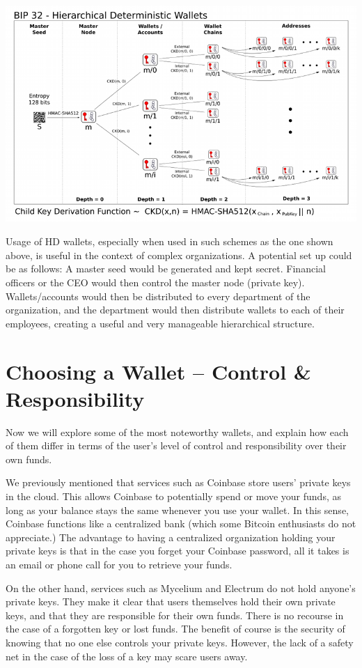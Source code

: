 \documentclass[11pt]{article}
\begin{document}
   \includegraphics[scale=4]{bip32}
   
   Usage of HD wallets, especially when used in such schemes as the one shown above, is useful in the context of complex organizations. A potential set up could be as follows: A master seed would be generated and kept secret. Financial officers or the CEO would then control the master node (private key). Wallets/accounts would then be distributed to every department of the organization, and the department would then distribute wallets to each of their employees, creating a useful and very manageable hierarchical structure.
   
   \section*{Choosing a Wallet -- Control \& Responsibility}
   
   Now we will explore some of the most noteworthy wallets, and explain how each of them differ in terms of the user's level of control and responsibility over their own funds.
   
   We previously mentioned that services such as Coinbase store users' private keys in the cloud. This allows Coinbase to potentially spend or move your funds, as long as your balance stays the same whenever you use your wallet. In this sense, Coinbase functions like a centralized bank (which some Bitcoin enthusiasts do not appreciate.) The advantage to having a centralized organization holding your private keys is that in the case you forget your Coinbase password, all it takes is an email or phone call for you to retrieve your funds.
   
   On the other hand, services such as Mycelium and Electrum do not hold anyone's private keys. They make it clear that users themselves hold their own private keys, and that they are responsible for their own funds. There is no recourse in the case of a forgotten key or lost funds. The benefit of course is the security of knowing that no one else controls your private keys. However, the lack of a safety net in the case of the loss of a key may scare users away.
   
\end{document}
